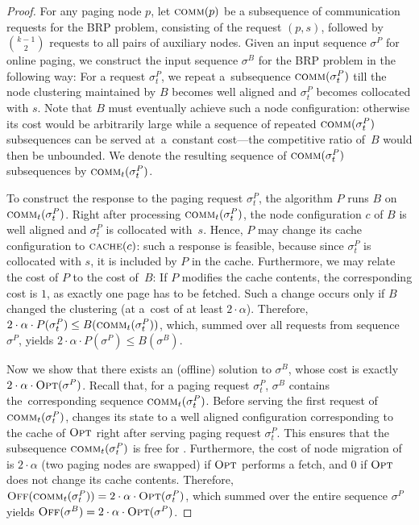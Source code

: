 \begin{proof}
For any paging node $p$, let $\textsc{comm}(p)$ be a subsequence of communication
requests for the BRP problem, consisting of the request $(p, s)$, followed by
$\binom{k-1}{2}$ requests to all pairs of auxiliary nodes. Given an input
sequence $\sigma^P$ for online paging, we construct the input sequence
$\sigma^B$ for the BRP problem in the following way: For a request
$\sigma^P_t$, we repeat a~subsequence $\textsc{comm}(\sigma^P_t)$ till the node
clustering maintained by $B$ becomes well aligned and $\sigma^P_t$ becomes
collocated with $s$. Note that $B$ must eventually achieve such a node
configuration: otherwise its cost would be arbitrarily large while a sequence
of repeated $\textsc{comm}(\sigma^P_t)$ subsequences can be served at~a~constant
cost---the competitive ratio of~$B$ would then be unbounded. We denote the
resulting sequence of $\textsc{comm}(\sigma^P_t)$ subsequences by
$\textsc{comm}_t(\sigma^P_t)$.

To construct the response to the paging request $\sigma^P_t$, the algorithm
$P$ runs $B$ on $\textsc{comm}_t(\sigma^P_t)$. Right after processing
$\textsc{comm}_t(\sigma^P_t)$, the node configuration $c$ of $B$ is well aligned and
$\sigma^P_t$ is collocated with~$s$. Hence, $P$ may change its cache
configuration to $\textsc{cache}(c)$: such a response is feasible, because
since $\sigma^P_t$ is collocated with $s$, it is included by $P$ in the cache.
Furthermore, we may relate the cost of $P$ to the cost of~$B$: If $P$ modifies
the cache contents, the corresponding cost is $1$, as exactly one page has to
be fetched. Such a change occurs only if $B$ changed the clustering 
(at a~cost of at least $2 \cdot \alpha$). Therefore, $2
\cdot \alpha \cdot P(\sigma^P_t) \leq B(\textsc{comm}_t(\sigma^P_t))$, which,
summed over all requests from sequence $\sigma^P$, yields $2 \cdot
\alpha \cdot P(\sigma^P) \leq B(\sigma^B)$.

Now we show that there exists an (offline) solution \OFF to $\sigma^B$, whose
cost is exactly $2 \cdot \alpha \cdot \textsc{Opt}(\sigma^P)$. Recall that, for a
paging request $\sigma^P_t$, $\sigma^B$ contains the~corresponding sequence
$\textsc{comm}_t(\sigma^P_t)$. Before serving the first request
of~$\textsc{comm}_t(\sigma^P_t)$, \OFF changes its state to a well aligned
configuration corresponding to the cache of $\textsc{Opt}$ right after serving paging
request $\sigma^P_t$. This ensures that the subsequence $\textsc{comm}_t(\sigma^P_t)$
is free for \OFF. Furthermore, the cost of node migration of \OFF is $2 \cdot
\alpha$ (two paging nodes are swapped) if $\textsc{Opt}$ performs a fetch, and 0 if
$\textsc{Opt}$ does not change its cache contents. Therefore,
$\textsc{Off}(\textsc{comm}_t(\sigma^P_t)) = 2 \cdot \alpha \cdot \textsc{Opt}(\sigma^P_t)$, which
summed over the entire sequence $\sigma^P$ yields $\textsc{Off}(\sigma^B) = 2 \cdot
\alpha \cdot \textsc{Opt}(\sigma^P)$.


\end{proof}
